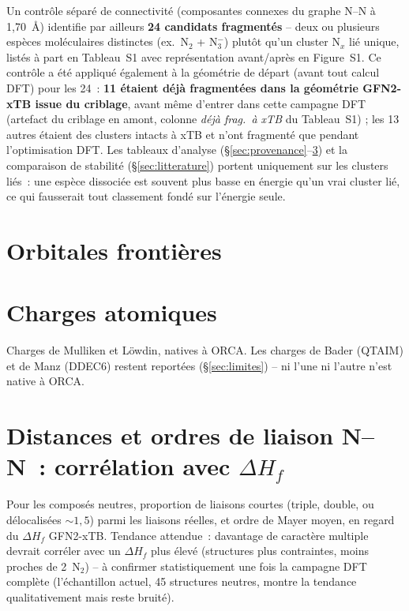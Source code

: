 \documentclass[11pt,a4paper]{article}
\begin{document}
Un contr\^ole s\'epar\'e de connectivit\'e (composantes connexes du
graphe N--N \`a 1,70~\AA) identifie par ailleurs \textbf{24 candidats
fragment\'es} -- deux ou plusieurs esp\`eces mol\'eculaires distinctes
(ex.\ N$_2$ + N$_3^-$) plut\^ot qu'un cluster N$_x$ li\'e unique, list\'es
\`a part en Tableau~S1 avec repr\'esentation avant/apr\`es en Figure~S1.
Ce contr\^ole a \'et\'e appliqu\'e \'egalement \`a la g\'eom\'etrie de
d\'epart (avant tout calcul DFT) pour les 24~: \textbf{11 \'etaient
d\'ej\`a fragment\'ees dans la g\'eom\'etrie GFN2-xTB issue du criblage},
avant m\^eme d'entrer dans cette campagne DFT (artefact du criblage en
amont, colonne \emph{d\'ej\`a frag.\ \`a xTB} du Tableau~S1) ; les 13
autres \'etaient des clusters intacts \`a xTB et n'ont fragment\'e que
pendant l'optimisation DFT. Les tableaux d'analyse
(\S\ref{sec:provenance}--\ref{sec:bonds}) et la comparaison de stabilit\'e
(\S\ref{sec:litterature}) portent uniquement sur les clusters li\'es~: une
esp\`ece dissoci\'ee est souvent plus basse en \'energie qu'un vrai
cluster li\'e, ce qui fausserait tout classement fond\'e sur l'\'energie
seule.

\section{Orbitales fronti\`eres}



\section{Charges atomiques}

Charges de Mulliken et L\"owdin, natives \`a ORCA. Les charges de Bader
(QTAIM) et de Manz (DDEC6) restent report\'ees (\S\ref{sec:limites}) --
ni l'une ni l'autre n'est native \`a ORCA.



\section{Distances et ordres de liaison N--N~: corr\'elation avec $\Delta H_f$}
\label{sec:bonds}

Pour les compos\'es neutres, proportion de liaisons courtes (triple,
double, ou d\'elocalis\'ees ${\sim}1{,}5$) parmi les liaisons r\'eelles, et
ordre de Mayer moyen, en regard du $\Delta H_f$ GFN2-xTB. Tendance
attendue~: davantage de caract\`ere multiple devrait corr\'eler avec un
$\Delta H_f$ plus \'elev\'e (structures plus contraintes, moins proches de
2~N$_2$) -- \`a confirmer statistiquement une fois la campagne DFT
compl\`ete (l'\'echantillon actuel, 45 structures neutres, montre la
tendance qualitativement mais reste bruit\'e).
\end{document}
